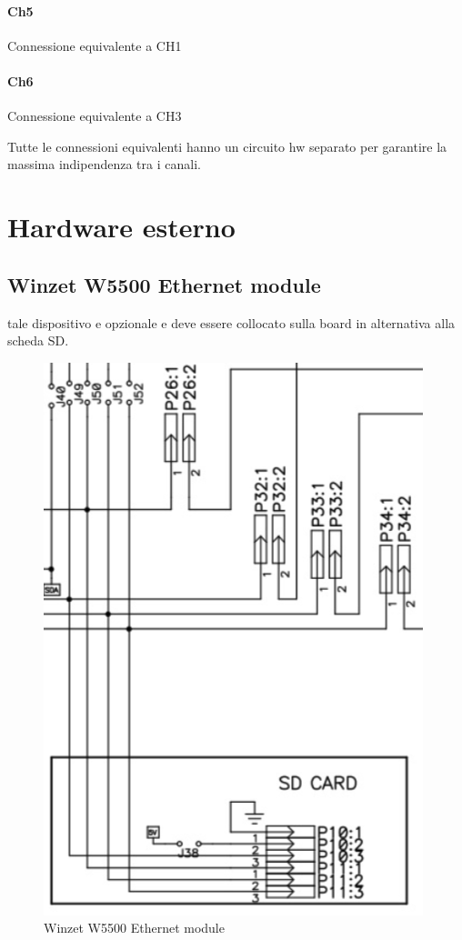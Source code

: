 \documentclass[12pt,a4paper]{report}
\begin{document}
\paragraph{Ch5}
Connessione equivalente a CH1

\paragraph{Ch6}
Connessione equivalente a CH3

Tutte le connessioni equivalenti hanno un circuito hw separato per garantire la massima indipendenza tra i canali.
\section{ Hardware esterno }

\subsection{Winzet W5500 Ethernet module}
tale dispositivo e opzionale e deve essere collocato sulla board in alternativa alla scheda SD.

\begin{figure}[H]
    \centering
    \includegraphics[width=0.7\linewidth]{../image/SD_and_W5500.png}
    \caption{Winzet W5500 Ethernet module}
\end{figure}
\end{document}
